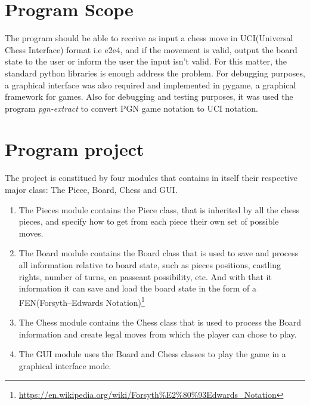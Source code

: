 \documentclass[10pt]{article}
\author{}
\title{}
\date{}
\begin{document}
\maketitle

\section{Program Scope}

The program should be able to receive as input a chess move in UCI(Universal
Chess Interface) format i.e
e2e4, and if the movement is valid, output the board state to the user or inform
the user the input isn't valid. For this matter, the standard python libraries is
enough address the problem. For debugging purposes, a graphical interface was
also required and implemented in pygame, a graphical framework for games. Also
for debugging and testing purposes, it was used the program
\textit{pgn-extract} to convert PGN game notation to UCI notation.


\section{Program project}

The project is constitued by four modules that contains in itself their
respective major class: The Piece, Board, Chess and GUI.
\begin{enumerate}
    \item The Pieces module contains the Piece class, that is inherited by all
        the chess pieces, and specify how to get from each piece their own set
        of possible moves.
        \item The Board module contains the Board class that is used to save and
            process all
            information relative to board state, such as pieces positions,
            castling rights, number of turns, en passeant possibility, etc.
            And with that it information it can save and load the board state
            in the form of a FEN(Forsyth–Edwards
            Notation)\footnote{\url{https://en.wikipedia.org/wiki/Forsyth\%E2\%80\%93Edwards_Notation}}
        \item The Chess module contains the Chess class that is used to process
            the Board information and create legal moves from which the player
            can chose to play.
        \item The GUI module uses the Board and Chess classes to play the game
            in a graphical interface mode.
\end{enumerate}
\end{document}
